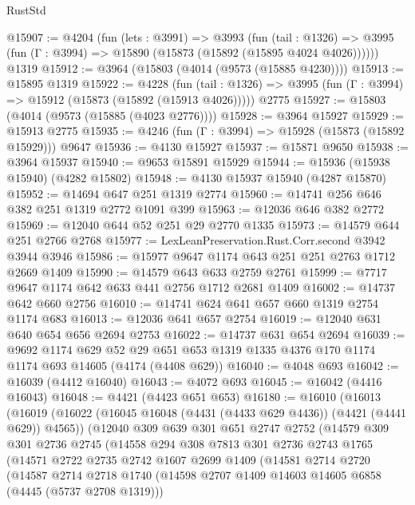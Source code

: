 \begin{lexlean}{RustStd}
\begin{coremodule}
{\begin{coremodule}
{{{{{{{{{{{{{{{{{{{{{{{{{{{{{{{{{{{{{{@15907 := @4204
    (fun (lets : @3991) =>
    @3993
      (fun (tail : @1326) =>
      @3995 (fun (Γ : @3994) => @15890 (@15873 (@15892 (@15895 @4024 @4026))))))
    @1319
@15912 := @3964 (@15803 (@4014 (@9573 (@15885 @4230))))
@15913 := @15895 @1319
@15922 := @4228
    (fun (tail : @1326) => @3995 (fun (Γ : @3994) => @15912 (@15873 (@15892 (@15913 @4026)))))
    @2775
@15927 := @15803 (@4014 (@9573 (@15885 (@4023 @2776))))
@15928 := @3964 @15927
@15929 := @15913 @2775
@15935 := @4246 (fun (Γ : @3994) => @15928 (@15873 (@15892 @15929))) @9647
@15936 := @4130 @15927
@15937 := @15871 @9650
@15938 := @3964 @15937
@15940 := @9653 @15891 @15929
@15944 := @15936 (@15938 @15940) (@4282 @15802)
@15948 := @4130 @15937 @15940 (@4287 @15870)
@15952 := @14694 @647 @251 @1319 @2774
@15960 := @14741 @256 @646 @382 @251 @1319 @2772 @1091 @399
@15963 := @12036 @646 @382 @2772
@15969 := @12040 @644 @52 @251 @29 @2770 @1335
@15973 := @14579 @644 @251 @2766 @2768
@15977 := LexLeanPreservation.Rust.Corr.second @3942 @3944 @3946
@15986 := @15977 @9647 @1174 @643 @251 @251 @2763 @1712 @2669 @1409
@15990 := @14579 @643 @633 @2759 @2761
@15999 := @7717 @9647 @1174 @642 @633 @441 @2756 @1712 @2681 @1409
@16002 := @14737 @642 @660 @2756
@16010 := @14741 @624 @641 @657 @660 @1319 @2754 @1174 @683
@16013 := @12036 @641 @657 @2754
@16019 := @12040 @631 @640 @654 @656 @2694 @2753
@16022 := @14737 @631 @654 @2694
@16039 := @9692
    @1174
    @629
    @52
    @29
    @651
    @653
    @1319
    @1335
    @4376
    @170
    @1174
    @1174
    @693
    @14605
    (@4174 (@4408 @629))
@16040 := @4048 @693
@16042 := @16039 (@4412 @16040)
@16043 := @4072 @693
@16045 := @16042 (@4416 @16043)
@16048 := @4421 (@4423 @651 @653)
@16180 := @16010
    (@16013
      (@16019
        (@16022 (@16045 @16048 (@4431 (@4433 @629 @4436)) (@4421 (@4441 @629)) @4565))
        (@12040
          @309
          @639
          @301
          @651
          @2747
          @2752
          (@14579
            @309
            @301
            @2736
            @2745
            (@14558
              @294
              @308
              @7813
              @301
              @2736
              @2743
              @1765
              (@14571
                @2722
                @2735
                @2742
                @1607
                @2699
                @1409
                (@14581
                  @2714
                  @2720
                  (@14587
                    @2714
                    @2718
                    @1740
                    (@14598 @2707 @1409 @14603 @14605 @6858 (@4445 (@5737 @2708 @1319)))
}}}}}}}}}}}}}}}}}}}}}}}}}}}}}}}}}}}}}}
\end{coremodule}}
\end{coremodule}
\end{lexlean}
